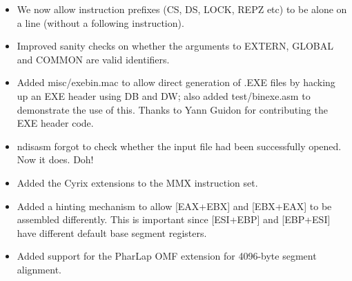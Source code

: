 \begin{itemize}
{        times, and the subsequent definitions are just ignored.}
    \item{We now allow instruction prefixes (CS, DS, LOCK, REPZ etc) to be
        alone on a line (without a following instruction).}
    \item{Improved sanity checks on whether the arguments to EXTERN, GLOBAL
        and COMMON are valid identifiers.}
    \item{Added misc/exebin.mac to allow direct generation of .EXE files by
        hacking up an EXE header using DB and DW; also added test/binexe.asm
        to demonstrate the use of this. Thanks to Yann Guidon for
        contributing the EXE header code.}
    \item{ndisasm forgot to check whether the input file had been successfully
        opened. Now it does. Doh!}
    \item{Added the Cyrix extensions to the MMX instruction set.}
    \item{Added a hinting mechanism to allow [EAX+EBX] and [EBX+EAX] to be
        assembled differently. This is important since [ESI+EBP] and
        [EBP+ESI] have different default base segment registers.}
    \item{Added support for the PharLap OMF extension for 4096-byte segment
        alignment.}
\end{itemize}


